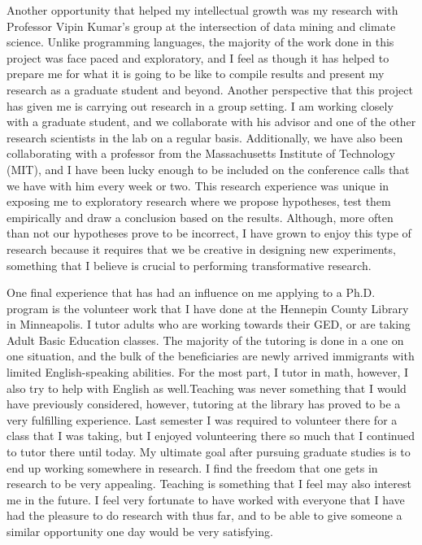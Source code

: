 \documentclass[a4paper,12pt]{article}
\newcommand{\tab}{\hspace*{2em}}
\begin{document}
\tab Another opportunity that helped my intellectual growth was my research with Professor Vipin Kumar's group at the intersection of data mining and climate science. Unlike programming languages, the majority of the work done in this project was face paced and exploratory, and I feel as though it has helped to prepare me for what it is going to be like to compile results and present my research as a graduate student and beyond. Another perspective that this project has given me is carrying out research in a group setting. I am working closely with a graduate student, and we collaborate with his advisor and one of the other research scientists in the lab on a regular basis. Additionally, we have also been collaborating with a professor from the Massachusetts Institute of Technology (MIT), and I have been lucky enough to be included on the conference calls that we have with him every week or two. This research experience was unique in exposing me to exploratory research where we propose hypotheses, test them empirically and draw a conclusion based on the results. Although, more often than not our hypotheses prove to be incorrect, I have grown to enjoy this type of research because it requires that we be creative in designing new experiments, something that I believe is crucial to performing transformative research.

One final experience that has had an influence on me applying to a Ph.D. program is the volunteer work that I have done at the Hennepin County Library in Minneapolis. I tutor adults who are working towards their GED, or are taking Adult Basic Education classes. The majority of the tutoring is done in a one on one situation, and the bulk of the beneficiaries are newly arrived immigrants with limited English-speaking abilities. For the most part, I tutor in math, however, I also try to help with English as well.Teaching was never something that I would have previously considered, however, tutoring at the library has proved to be a very fulfilling experience.  Last semester I was required to volunteer there for a class that I was taking, but I enjoyed volunteering there so much that I continued to tutor there until today.  \newline
\tab My ultimate goal after pursuing graduate studies is to end up working somewhere in research.  I find the freedom that one gets in research to be very appealing.  Teaching is something that I feel may also interest me in the future.  I feel very fortunate to have worked with everyone that I have had the pleasure to do research with thus far, and to be able to give someone a similar opportunity one day would be very satisfying.
\end{document}
